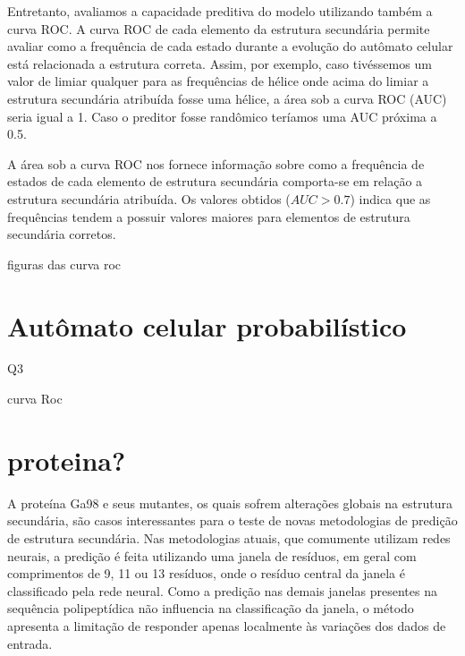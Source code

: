 Entretanto, avaliamos a capacidade preditiva do modelo utilizando também a curva ROC. A curva ROC de cada elemento da estrutura secundária permite avaliar como a frequência de cada estado durante a evolução do autômato celular está relacionada a estrutura correta. Assim, por exemplo, caso tivéssemos um valor de limiar qualquer para as frequências de hélice onde acima do limiar a estrutura secundária atribuída fosse uma hélice, a área sob a curva ROC (AUC) seria igual a 1. Caso o preditor fosse randômico teríamos uma AUC próxima a 0.5. 

A área sob a curva ROC nos fornece informação sobre como a frequência de estados de cada elemento de estrutura secundária comporta-se em relação a estrutura secundária atribuída. Os valores obtidos ($AUC > 0.7$) indica que as frequências tendem a possuir valores maiores para elementos de estrutura secundária corretos.

figuras das curva roc   




\section{Autômato celular probabilístico}



Q3

curva Roc


\section{proteina?}



A proteína Ga98 e seus mutantes, os quais sofrem alterações globais na estrutura secundária, são casos interessantes para o teste de novas metodologias de predição de estrutura secundária. Nas metodologias atuais, que comumente utilizam redes neurais, a predição é feita utilizando uma janela de resíduos, em geral com comprimentos de 9, 11 ou 13 resíduos, onde o resíduo central da janela é classificado pela rede neural. Como a predição nas demais janelas presentes na sequência polipeptídica não influencia na classificação da janela, o método apresenta a limitação de responder apenas localmente às variações dos dados de entrada.  

